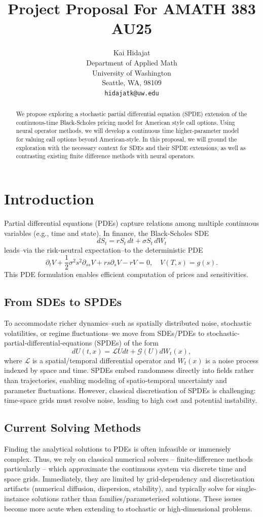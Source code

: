 \documentclass{article}
\title{Project Proposal For AMATH 383 AU25}
\author{%
  Kai Hidajat \\
  Department of Applied Math \\
  University of Washington \\
  Seattle, WA, 98109\\
  \texttt{hidajatk@uw.edu} \\
}
\begin{document}
\maketitle


\begin{abstract}
    We propose exploring a stochastic partial differential equation (SPDE) extension of the continuous-time Black-Scholes pricing model for American style call options. Using neural operator methods, we will develop a continuous time higher-parameter model for valuing call options beyond American-style. In this proposal, we will ground the exploration with the necessary context for SDEs and their SPDE extensions, as well as contrasting existing finite difference methods with neural operators.
\end{abstract}

\clearpage

\section{Introduction} %
Partial differential equations (PDEs) capture relations among multiple continuous variables (e.g., time and state). In finance, the Black-Scholes SDE
\[
    dS_t = rS_t \,dt + \sigma S_t \,dW_t
\]
leads--via the risk‐neutral expectation--to the deterministic PDE \citep{nayak2025mathematicalmodelingoptionpricing}
\[
    \partial_t V + \frac12\sigma^2 s^2 \partial_{ss}V + r s\partial_sV - rV = 0,\quad V(T,s)=g(s).
\]
This PDE formulation enables efficient computation of prices and sensitivities.  

\subsection{From SDEs to SPDEs}
To accommodate richer dynamics--such as spatially distributed noise, stochastic volatilities, or regime fluctuations--we move from SDEs/PDEs to stochastic‐partial‐differential‐equations (SPDEs) of the form
\[
    dU(t,x)=\mathcal LU dt + \mathcal G(U) dW_t(x),
\]
where \(\mathcal L\) is a spatial/temporal differential operator and \(W_t(x)\) is a noise process indexed by space and time. SPDEs embed randomness directly into fields rather than trajectories, enabling modeling of spatio‐temporal uncertainty and parameter fluctuations. However, classical discretisation of SPDEs is challenging: time-space grids must resolve noise, leading to high cost and potential instability.

\subsection{Current Solving Methods}
Finding the analytical solutions to PDEs is often infeasible or immensely complex. Thus, we rely on classical numerical solvers -- finite‐difference methods particularly -- which approximate the continuous system via discrete time and space grids. Immediately, they are limited by grid‐dependency and discretisation artifacts (numerical diffusion, dispersion, stability), and typically solve for single‐instance solutions rather than families/parameterised solutions. These issues become more acute when extending to stochastic or high‐dimensional problems.
\end{document}
